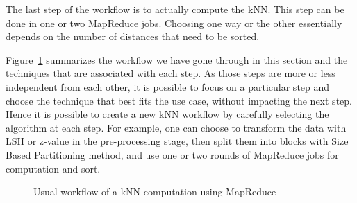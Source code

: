 The last step of the workflow is to actually compute the kNN. This step can be done in one or two MapReduce jobs. Choosing one way or the other essentially depends on the number of distances that need to be sorted.



Figure~\ref{workflow} summarizes the 
workflow we have gone through in this section and the techniques that are associated with each step. 
As those steps are more or 
less independent from each other, it is possible to focus on a particular step and  choose the 
technique that best fits  the use case, without 
impacting the next step. Hence it is possible to create a new kNN workflow by carefully selecting 
the algorithm at each step. For example, one can choose to transform the data with LSH or z-value in the pre-processing stage, then split them into blocks with Size Based Partitioning method, and use one or two rounds of MapReduce jobs for computation and sort.


\begin{figure}[t]
\center
{}
\caption{Usual workflow of a kNN computation using MapReduce \label{workflow}}
\end{figure}
